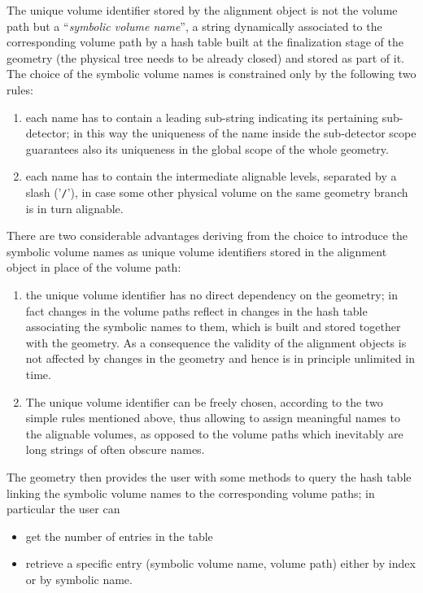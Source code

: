 \documentclass[12pt,a4paper,twoside]{article}
\begin{document}
{The unique volume identifier stored by
the alignment object is not the volume path but a ``\emph{symbolic volume
name}'', a string dynamically associated to the corresponding volume
path by a hash table built at the finalization stage of the geometry
(the physical tree needs to be already closed) and stored as part of it.
The choice of the symbolic volume names is constrained only by the
following two rules:
\begin{enumerate}
  \item each name has to contain a leading sub-string indicating its
  pertaining sub-detector; in this way the uniqueness of the name inside
  the sub-detector scope guarantees also its uniqueness in the global
  scope of the whole geometry.
  \item each name has to contain the intermediate alignable levels,
  separated by a slash ('\texttt{/}'), in case some other physical
  volume on the same geometry branch is in turn alignable.
\end{enumerate}
There are two considerable advantages deriving from the choice to
introduce the symbolic volume names as unique volume identifiers
stored in the alignment object in place of the volume path:
\begin{enumerate}
  \item the unique volume identifier has no direct dependency on the
  geometry; in fact changes in the volume paths reflect in changes in
  the hash table associating the symbolic names to them, which is
  built and stored together with the geometry.  As a consequence the
  validity of the alignment objects is not affected by changes in the
  geometry and hence is in principle unlimited in time.
  \item The unique volume identifier can be freely chosen, according
  to the two simple rules mentioned above, thus allowing to assign
  meaningful names to the alignable volumes, as opposed to the volume
  paths which inevitably are long strings of often obscure names.
\end{enumerate}
The geometry then provides the user with some methods to query the hash table
linking the symbolic volume names to the 
corresponding volume paths; in particular the user can 
\begin{itemize}
  \item get the number of entries in the table
  \item retrieve a specific entry (symbolic volume name,
    volume path) either by index or by symbolic name.
\end{itemize}


}
\end{document}
